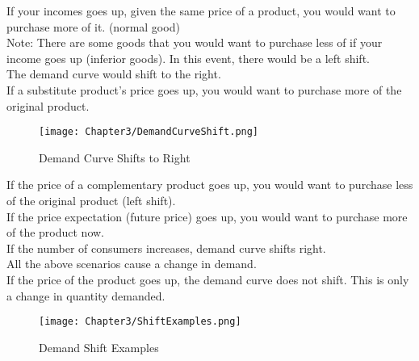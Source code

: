 \begin{example}
    If your incomes goes up, given the same price of a product, you would want to purchase more of it. (normal good)\\
    Note: There are some goods that you would want to purchase less of if your income goes up (inferior goods). In this event, there would be a left shift.\\
    The demand curve would shift to the right.\\ If a substitute product's price goes up, 
    you would want to purchase more of the original product.
    \begin{figure}[h!]
        \centering
        \texttt{[image: Chapter3/DemandCurveShift.png]}
        \caption{Demand Curve Shifts to Right}
    \end{figure}
    If the price of a complementary product goes up, you would want to purchase less of the original product (left shift).\\
    If the price expectation (future price) goes up, you would want to purchase more of the product now.\\
    If the number of consumers increases, demand curve shifts right.\\
    All the above scenarios cause a change in demand.\\
    If the price of the product goes up, the demand curve does not shift. This is only a change in quantity demanded.
\end{example}
\begin{figure}[h!]
    \centering
    \texttt{[image: Chapter3/ShiftExamples.png]}
    \caption{Demand Shift Examples}
\end{figure}